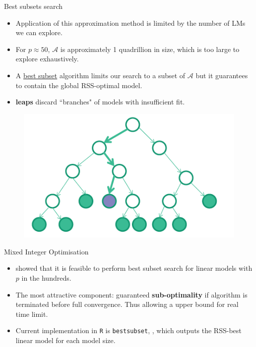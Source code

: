 \documentclass[12pt,aspectratio=169]{beamer}
\begin{document}
\begin{frame}{Best subsets search}
	\begin{itemize}
		
		\item Application of this approximation method is limited by the number of LMs we can explore.
		
		\item For $ p \approx 50 $, $ \mathcal{A}$ is approximately 1 quadrillion in size, which is too large to explore exhaustively. 
		
		\item A \underline{best subset} algorithm limits our search to a subset of $ \mathcal{A} $ but it guarantees to contain the global RSS-optimal model.
		
		\item \textbf{leaps} \citep{Furnival1974, Lumley2017} discard ``branches" of models with insufficient fit. 
	\end{itemize}

\begin{figure}
	\centering
	\includegraphics[width=0.35\linewidth]{branch_and_bound}
	\label{fig:branchandbound}
\end{figure}
\end{frame}



\begin{frame}{Mixed Integer Optimisation}
\begin{itemize}
	\item \citet{Bertsimas2016} showed that it is feasible to perform best subset search for linear models with $ p $ in the hundreds.
	\item The most attractive component: guaranteed \textbf{sub-optimality} if algorithm is terminated before full convergence. Thus allowing a upper bound for real time limit.
	\item Current implementation in \texttt{R} is \texttt{bestsubset}, \citep{Hastie2017}, which outputs the RSS-best linear model for each model size. 
\end{itemize}
\end{frame}
\end{document}
